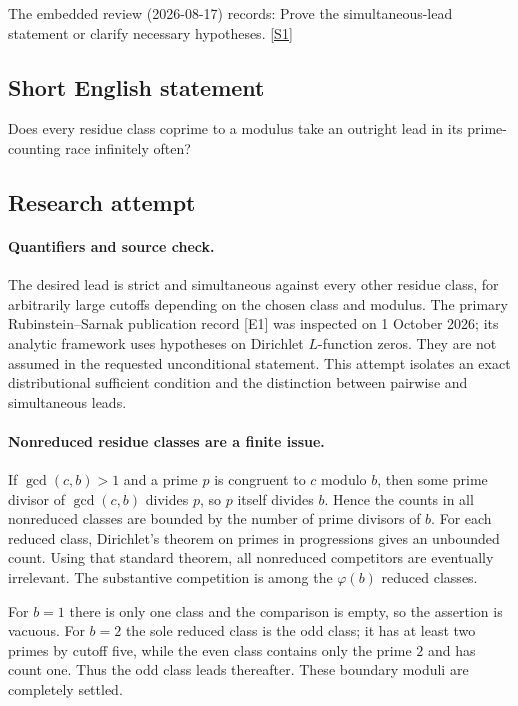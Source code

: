 \documentclass[11pt,a4paper]{article}
\newcommand{\sref}[2]{\hyperlink{source:#1:#2}{[S#2]}}
\begin{document}
The embedded review (2026-08-17) records: Prove the simultaneous-lead statement or clarify necessary hypotheses. \sref{statement}{1}

\subsection{Short English statement}

Does every residue class coprime to a modulus take an outright lead in its prime-counting race infinitely often?

\subsection{Research attempt}

\paragraph{Quantifiers and source check.}
The desired lead is strict and simultaneous against every other residue
class, for arbitrarily large cutoffs depending on the chosen class and
modulus. The primary Rubinstein--Sarnak publication record [E1] was
inspected on 1 October 2026; its analytic framework uses hypotheses
on Dirichlet $L$-function zeros. They are not assumed in the requested
unconditional statement. This attempt isolates an exact distributional
sufficient condition and the distinction between pairwise and simultaneous
leads.

\paragraph{Nonreduced residue classes are a finite issue.}
If $\gcd(c,b)>1$ and a prime $p$ is congruent to $c$ modulo $b$,
then some prime divisor of $\gcd(c,b)$ divides $p$, so $p$ itself
divides $b$. Hence the counts in all nonreduced classes are bounded
by the number of prime divisors of $b$. For each reduced class,
Dirichlet's theorem on primes in progressions gives an unbounded count.
Using that standard theorem, all nonreduced competitors are eventually
irrelevant. The substantive competition is among the $\varphi(b)$
reduced classes.

For $b=1$ there is only one class and the comparison is empty, so the
assertion is vacuous. For $b=2$ the sole reduced class is the odd class;
it has at least two primes by cutoff five, while the even class contains
only the prime $2$ and has count one. Thus the odd class leads thereafter.
These boundary moduli are completely settled.
\end{document}
